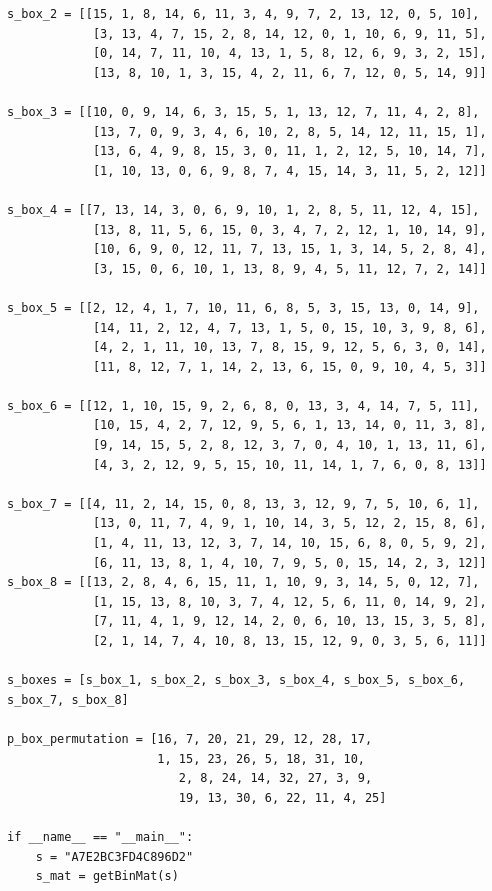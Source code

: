 \documentclass{article}
\begin{document}
\begin{verbatim}
s_box_2 = [[15, 1, 8, 14, 6, 11, 3, 4, 9, 7, 2, 13, 12, 0, 5, 10],
            [3, 13, 4, 7, 15, 2, 8, 14, 12, 0, 1, 10, 6, 9, 11, 5],
            [0, 14, 7, 11, 10, 4, 13, 1, 5, 8, 12, 6, 9, 3, 2, 15],
            [13, 8, 10, 1, 3, 15, 4, 2, 11, 6, 7, 12, 0, 5, 14, 9]]

s_box_3 = [[10, 0, 9, 14, 6, 3, 15, 5, 1, 13, 12, 7, 11, 4, 2, 8],
            [13, 7, 0, 9, 3, 4, 6, 10, 2, 8, 5, 14, 12, 11, 15, 1],
            [13, 6, 4, 9, 8, 15, 3, 0, 11, 1, 2, 12, 5, 10, 14, 7],
            [1, 10, 13, 0, 6, 9, 8, 7, 4, 15, 14, 3, 11, 5, 2, 12]]

s_box_4 = [[7, 13, 14, 3, 0, 6, 9, 10, 1, 2, 8, 5, 11, 12, 4, 15],
            [13, 8, 11, 5, 6, 15, 0, 3, 4, 7, 2, 12, 1, 10, 14, 9],
            [10, 6, 9, 0, 12, 11, 7, 13, 15, 1, 3, 14, 5, 2, 8, 4],
            [3, 15, 0, 6, 10, 1, 13, 8, 9, 4, 5, 11, 12, 7, 2, 14]]

s_box_5 = [[2, 12, 4, 1, 7, 10, 11, 6, 8, 5, 3, 15, 13, 0, 14, 9],
            [14, 11, 2, 12, 4, 7, 13, 1, 5, 0, 15, 10, 3, 9, 8, 6],
            [4, 2, 1, 11, 10, 13, 7, 8, 15, 9, 12, 5, 6, 3, 0, 14],
            [11, 8, 12, 7, 1, 14, 2, 13, 6, 15, 0, 9, 10, 4, 5, 3]]

s_box_6 = [[12, 1, 10, 15, 9, 2, 6, 8, 0, 13, 3, 4, 14, 7, 5, 11],
            [10, 15, 4, 2, 7, 12, 9, 5, 6, 1, 13, 14, 0, 11, 3, 8],
            [9, 14, 15, 5, 2, 8, 12, 3, 7, 0, 4, 10, 1, 13, 11, 6],
            [4, 3, 2, 12, 9, 5, 15, 10, 11, 14, 1, 7, 6, 0, 8, 13]]

s_box_7 = [[4, 11, 2, 14, 15, 0, 8, 13, 3, 12, 9, 7, 5, 10, 6, 1],
            [13, 0, 11, 7, 4, 9, 1, 10, 14, 3, 5, 12, 2, 15, 8, 6],
            [1, 4, 11, 13, 12, 3, 7, 14, 10, 15, 6, 8, 0, 5, 9, 2],
            [6, 11, 13, 8, 1, 4, 10, 7, 9, 5, 0, 15, 14, 2, 3, 12]]
s_box_8 = [[13, 2, 8, 4, 6, 15, 11, 1, 10, 9, 3, 14, 5, 0, 12, 7],
            [1, 15, 13, 8, 10, 3, 7, 4, 12, 5, 6, 11, 0, 14, 9, 2],
            [7, 11, 4, 1, 9, 12, 14, 2, 0, 6, 10, 13, 15, 3, 5, 8],
            [2, 1, 14, 7, 4, 10, 8, 13, 15, 12, 9, 0, 3, 5, 6, 11]]

s_boxes = [s_box_1, s_box_2, s_box_3, s_box_4, s_box_5, s_box_6, s_box_7, s_box_8]

p_box_permutation = [16, 7, 20, 21, 29, 12, 28, 17,
                     1, 15, 23, 26, 5, 18, 31, 10,
                        2, 8, 24, 14, 32, 27, 3, 9,
                        19, 13, 30, 6, 22, 11, 4, 25]

if __name__ == "__main__":
    s = "A7E2BC3FD4C896D2"
    s_mat = getBinMat(s)
    

\end{verbatim}
\end{document}
